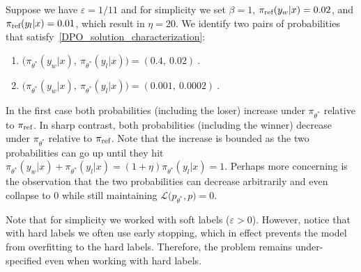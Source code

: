 \begin{remark}
Suppose we have $\varepsilon=1/11$ and for simplicity we set $\beta=1$, $\pi_{\textrm{ref}}(y_w|x) = 0.02$, and $\pi_{\textrm{ref}}(y_l|x) = 0.01$, which result in $\eta = 20$. We identify two pairs of probabilities that satisfy~\eqref{DPO_solution_characterization}: 
\begin{enumerate}
    \item $\big(\pi_{\theta^{*}}(y_w|x),\ \pi_{\theta^{*}}(y_l|x)\big) = (0.4,\ 0.02) \ .$
    \item $\big(\pi_{\theta^{*}}(y_w|x),\ \pi_{\theta^{*}}(y_l|x)\big) = (0.001,\ 0.0002)\ .$
\end{enumerate}
In the first case both probabilities (including the loser) increase under $\pi_{\theta^{*}}$ relative to $\pi_{\textrm{ref}}$. In sharp contrast, both probabilities (including the winner) decrease under $\pi_{\theta^{*}}$ relative to $\pi_{\textrm{ref}}$. Note that the increase is bounded as the two probabilities can go up until they hit $\pi_{\theta^{*}}(y_w|x) + \pi_{\theta^{*}}(y_l|x) = (1 + \eta) \pi_{\theta^{*}}(y_l | x) = 1$. Perhaps more concerning is the observation that the two probabilities can decrease arbitrarily and even collapse to $0$ while still maintaining ${\mathcal L}\big(p_{\theta^{*}},p\big) = 0$.
\end{remark}

Note that for simplicity we worked with soft labels ($\varepsilon > 0$). However, notice that with hard labels we often use early stopping, which in effect prevents the model from overfitting to the hard labels. Therefore, the problem remains under-specified even when working with hard labels.  